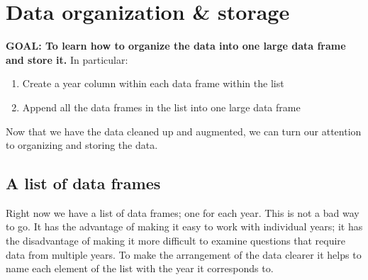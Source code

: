 \documentclass[
]{book}
\newenvironment{Shaded}{\begin{snugshade}}{\end{snugshade}}
\newcommand{\CommentTok}[1]{\textcolor[rgb]{0.56,0.35,0.01}{\textit{#1}}}
\newcommand{\DataTypeTok}[1]{\textcolor[rgb]{0.13,0.29,0.53}{#1}}
\newcommand{\KeywordTok}[1]{\textcolor[rgb]{0.13,0.29,0.53}{\textbf{#1}}}
\newcommand{\NormalTok}[1]{#1}
\newcommand{\OperatorTok}[1]{\textcolor[rgb]{0.81,0.36,0.00}{\textbf{#1}}}
\newcommand{\StringTok}[1]{\textcolor[rgb]{0.31,0.60,0.02}{#1}}
\providecommand{\tightlist}{%
  \setlength{\itemsep}{0pt}\setlength{\parskip}{0pt}}
\begin{document}
\hypertarget{data-organization-storage}{%
\section{Data organization \& storage}\label{data-organization-storage}}

\textbf{GOAL: To learn how to organize the data into one large data frame and store it.} In particular:

\begin{enumerate}
\def\labelenumi{\arabic{enumi}.}
\tightlist
\item
  Create a year column within each data frame within the list
\item
  Append all the data frames in the list into one large data frame
\end{enumerate}

Now that we have the data cleaned up and augmented, we can turn our attention to organizing and storing the data.

\hypertarget{a-list-of-data-frames}{%
\subsection{A list of data frames}\label{a-list-of-data-frames}}

Right now we have a list of data frames; one for each year. This is not a bad way to go. It has the advantage of making it easy to work with individual years; it has the disadvantage of making it more difficult to examine questions that require data from multiple years. To make the arrangement of the data clearer it helps to name each element of the list with the year it corresponds to.

\begin{Shaded}
\end{Shaded}
\end{document}
